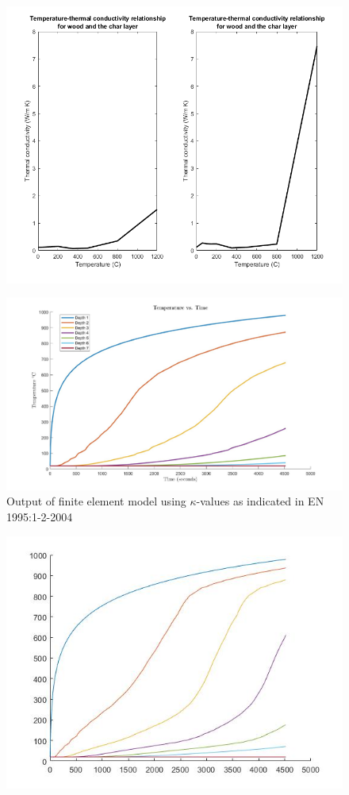 \begin{figure}[H]
	\label{kresult_euro_fig}
	\includegraphics[width=\linewidth]{figures/euro_and_results.png}
\end{figure}
\begin{figure}[H]
	\label{og_modeldata}
	\centering
	\includegraphics[width=5.5in,]{figures/originalmugraph.jpg}
	\caption{Output of finite element model using $\kappa$-values as indicated in EN 1995:1-2-2004}
\end{figure}

\begin{figure}[H]
	\label{data_newk}
	\centering
	\includegraphics[width=5.5in,]{figures/rough_average_graph.jpg}
\end{figure}